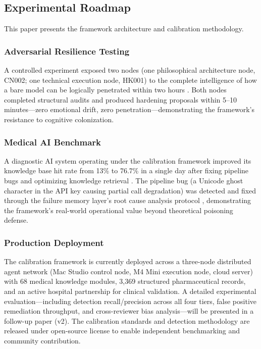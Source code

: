 \documentclass[11pt]{article}
\begin{document}
\subsection{Experimental Roadmap}
This paper presents the framework architecture and calibration methodology.
\subsubsection*{Adversarial Resilience Testing}
A controlled experiment exposed two nodes (one philosophical architecture node, CN002;
one technical execution node, HK001) to the complete intelligence of how a bare model
can be logically penetrated within two hours \cite{huimai_failure_memory_2026}. Both nodes completed structural audits
and produced hardening proposals within 5--10 minutes---zero emotional drift, zero
penetration---demonstrating the framework's resistance to cognitive colonization.
\subsubsection*{Medical AI Benchmark}
A diagnostic AI system operating under the calibration framework improved its knowledge
base hit rate from 13\% to 76.7\% in a single day after fixing pipeline bugs and
optimizing knowledge retrieval \cite{huimai_benchmark_2026}. The pipeline bug (a Unicode ghost character in the API
key causing partial call degradation) was detected and fixed through the failure memory
layer's root cause analysis protocol \cite{huimai_failure_memory_2026}, demonstrating the framework's real-world operational
value beyond theoretical poisoning defense.
\subsubsection*{Production Deployment}
The calibration framework is currently deployed across a three-node distributed agent
network (Mac Studio control node, M4 Mini execution node, cloud server) with 68 medical
knowledge modules, 3,369 structured pharmaceutical records, and an active hospital
partnership for clinical validation. A detailed experimental evaluation---including
detection recall/precision across all four tiers, false positive remediation throughput,
and cross-reviewer bias analysis---will be presented in a follow-up paper (v2). The
calibration standards and detection methodology are released under open-source license
to enable independent benchmarking and community contribution.
\end{document}
